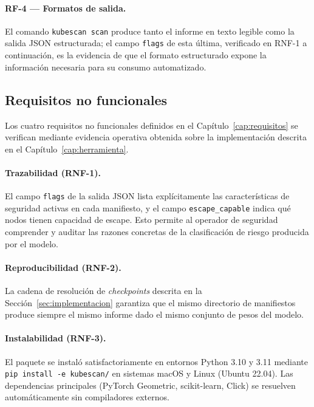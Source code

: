 \paragraph{RF-4 — Formatos de salida.} El comando \texttt{kubescan scan} produce
tanto el informe en texto legible como la salida \acs{JSON} estructurada; el
campo \texttt{flags} de esta última, verificado en RNF-1 a continuación, es la
evidencia de que el formato estructurado expone la información necesaria para
su consumo automatizado.

\subsection{Requisitos no funcionales}

Los cuatro requisitos no funcionales definidos en el Capítulo~\ref{cap:requisitos}
se verifican mediante evidencia operativa obtenida sobre la implementación
descrita en el Capítulo~\ref{cap:herramienta}.

\paragraph{Trazabilidad (RNF-1).} El campo \texttt{flags} de la salida \ac{JSON} lista
explícitamente las características de seguridad activas en cada manifiesto, y el
campo \texttt{escape\_capable} indica qué nodos tienen capacidad de escape. Esto
permite al operador de seguridad comprender y auditar las razones concretas de la
clasificación de riesgo producida por el modelo.

\paragraph{Reproducibilidad (RNF-2).} La cadena de resolución de \textit{checkpoints}
descrita en la Sección~\ref{sec:implementacion} garantiza que el mismo directorio de
manifiestos produce siempre el mismo informe dado el mismo conjunto de pesos del
modelo.

\paragraph{Instalabilidad (RNF-3).} El paquete se instaló satisfactoriamente en
entornos Python 3.10 y 3.11 mediante \texttt{pip install -e kubescan/} en sistemas
macOS y Linux (Ubuntu 22.04). Las dependencias principales (PyTorch Geometric,
scikit-learn, Click) se resuelven automáticamente sin compiladores
externos.

